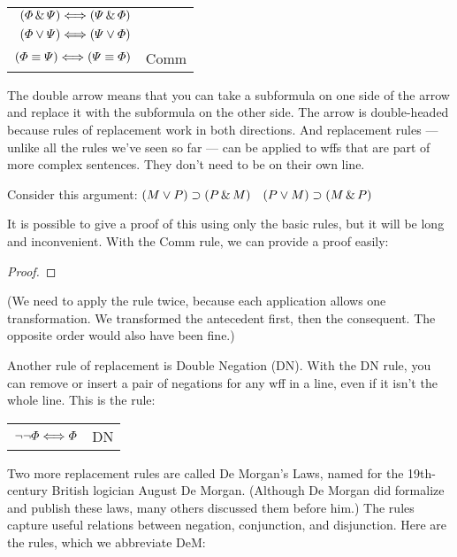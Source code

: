 \begin{center}
\begin{tabular}{rl}
$(\varPhi{}\,\&\,\varPsi{}) \Longleftrightarrow (\varPsi{}\,\&\,\varPhi{})$\\
$(\varPhi{}\vee\varPsi{}) \Longleftrightarrow (\varPsi{}\vee\varPhi{})$\\
$(\varPhi{}\equiv\varPsi{}) \Longleftrightarrow (\varPsi{}\equiv\varPhi{})$
& Comm
\end{tabular}
\end{center}

The double arrow means that you can take a subformula on one side of the arrow and replace it with the subformula on the other side. The arrow is double-headed because rules of replacement work in both directions. And replacement rules --- unlike all the rules we've seen so far --- can be applied to wffs that are part of more complex sentences. They don't need to be on their own line.

Consider this argument: $(M \vee P) \supset (P \,\&\, M)$ \therefore\ $(P \vee M) \supset (M \,\&\, P)$

It is possible to give a proof of this using only the basic rules, but it will be long and inconvenient. With the Comm rule, we can provide a proof easily:

\begin{proof}
\end{proof}

(We need to apply the rule twice, because each application allows one transformation. We transformed the antecedent first, then the consequent. The opposite order would also have been fine.)

Another rule of replacement is Double Negation (DN). With the DN rule, you can remove or insert a pair of negations for any wff in a line, even if it isn't the whole line. This is the rule:

\begin{center}
\begin{tabular}{rl}
$\neg\neg\varPhi{} \Longleftrightarrow \varPhi{}$ & DN
\end{tabular}
\end{center}

Two more replacement rules  are called De Morgan's Laws, named for the 19th-century British logician August De Morgan. (Although De Morgan did formalize and publish these laws, many others discussed them before him.) The rules capture useful relations between negation, conjunction, and disjunction. Here are the rules, which we abbreviate DeM:

